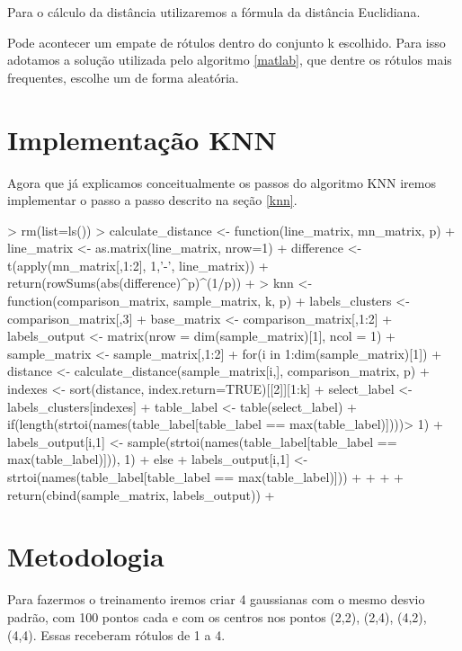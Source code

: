 \documentclass[12pt]{article}
\begin{document}
  \par Para o cálculo da distância utilizaremos a fórmula da distância Euclidiana. 
  
  \par Pode acontecer um empate de rótulos dentro do conjunto k escolhido. Para isso adotamos a solução utilizada pelo algoritmo \ref{matlab}, que dentre os rótulos mais frequentes, escolhe um de forma aleatória. 

\section{Implementação KNN}

  \par Agora que já explicamos  conceitualmente os passos do algoritmo KNN iremos implementar o passo a passo descrito na seção \ref{knn}.
  
\begin{Schunk}
\begin{Sinput}
> rm(list=ls())
> calculate_distance <- function(line_matrix, mn_matrix, p){
+   line_matrix <- as.matrix(line_matrix, nrow=1)
+   difference <- t(apply(mn_matrix[,1:2], 1,'-', line_matrix))
+   return(rowSums(abs(difference)^p)^(1/p))
+ }
> knn <- function(comparison_matrix, sample_matrix, k, p){
+     labels_clusters <- comparison_matrix[,3]
+     base_matrix <-  comparison_matrix[,1:2]
+     labels_output <- matrix(nrow = dim(sample_matrix)[1], ncol = 1)
+     sample_matrix <- sample_matrix[,1:2]
+     for(i in 1:dim(sample_matrix)[1]){
+       distance <- calculate_distance(sample_matrix[i,], comparison_matrix, p)
+       indexes <- sort(distance, index.return=TRUE)[[2]][1:k]
+       select_label <- labels_clusters[indexes]
+       table_label <- table(select_label)
+       if(length(strtoi(names(table_label[table_label == max(table_label)])))> 1){
+          labels_output[i,1] <- sample(strtoi(names(table_label[table_label == max(table_label)])), 1)
+       }else{
+         labels_output[i,1] <- strtoi(names(table_label[table_label == max(table_label)]))
+       }
+       
+     }
+     return(cbind(sample_matrix, labels_output))
+ }
\end{Sinput}
\end{Schunk}

\section{Metodologia}
  \par Para fazermos o treinamento iremos  criar 4 gaussianas com o mesmo desvio padrão, com 100 pontos cada e com os centros nos pontos (2,2), (2,4), (4,2), (4,4). Essas receberam rótulos de 1 a 4. 
  
\end{document}
